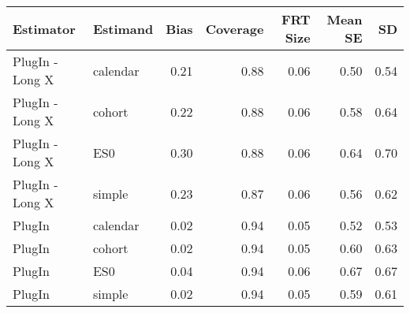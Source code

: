 \captionsetup[table]{labelformat=empty,skip=1pt}
\begin{longtable}{llrrrrr}
\toprule
Estimator & Estimand & Bias & Coverage & FRT Size & Mean SE & SD \\ 
\midrule
PlugIn - Long X & calendar & 0.21 & 0.88 & 0.06 & 0.50 & 0.54 \\ 
PlugIn - Long X & cohort & 0.22 & 0.88 & 0.06 & 0.58 & 0.64 \\ 
PlugIn - Long X & ES0 & 0.30 & 0.88 & 0.06 & 0.64 & 0.70 \\ 
PlugIn - Long X & simple & 0.23 & 0.87 & 0.06 & 0.56 & 0.62 \\ 
PlugIn & calendar & 0.02 & 0.94 & 0.05 & 0.52 & 0.53 \\ 
PlugIn & cohort & 0.02 & 0.94 & 0.05 & 0.60 & 0.63 \\ 
PlugIn & ES0 & 0.04 & 0.94 & 0.06 & 0.67 & 0.67 \\ 
PlugIn & simple & 0.02 & 0.94 & 0.05 & 0.59 & 0.61 \\ 
 \bottomrule
\end{longtable}

